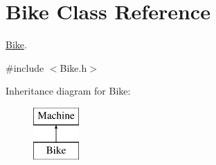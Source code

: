 \hypertarget{class_bike}{}\section{Bike Class Reference}
\label{class_bike}


\hyperlink{class_bike}{Bike}.  




{\ttfamily \#include $<$Bike.\+h$>$}

Inheritance diagram for Bike\+:\begin{figure}[H]
\begin{center}
\leavevmode
\includegraphics[height=2.000000cm]{class_bike}
\end{center}
\end{figure}
